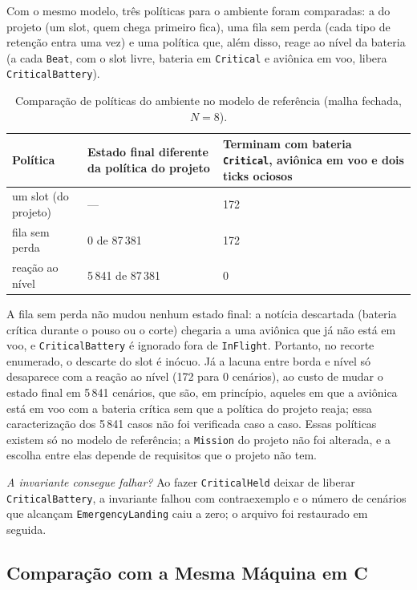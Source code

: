 \documentclass[12pt,a4paper]{article}
\begin{document}
Com o mesmo modelo, três políticas para o ambiente foram comparadas: a do projeto (um slot, quem chega primeiro fica), uma fila sem perda (cada tipo de retenção entra uma vez) e uma política que, além disso, reage ao nível da bateria (a cada \texttt{Beat}, com o slot livre, bateria em \texttt{Critical} e aviônica em voo, libera \texttt{CriticalBattery}).

\begin{table}[h]
\centering
\footnotesize
\begin{tabular}{|p{5.2cm}|p{4.6cm}|p{4.6cm}|}
\hline
Política & Estado final diferente da política do projeto & Terminam com bateria \texttt{Critical}, aviônica em voo e dois ticks ociosos \\
\hline
um slot (do projeto) & --- & 172 \\
\hline
fila sem perda & 0 de 87\,381 & 172 \\
\hline
reação ao nível & 5\,841 de 87\,381 & 0 \\
\hline
\end{tabular}
\caption{Comparação de políticas do ambiente no modelo de referência (malha fechada, $N = 8$).}
\end{table}

A fila sem perda não mudou nenhum estado final: a notícia descartada (bateria crítica durante o pouso ou o corte) chegaria a uma aviônica que já não está em voo, e \texttt{CriticalBattery} é ignorado fora de \texttt{InFlight}. Portanto, no recorte enumerado, o descarte do slot é inócuo. Já a lacuna entre borda e nível só desaparece com a reação ao nível (172 para 0 cenários), ao custo de mudar o estado final em 5\,841 cenários, que são, em princípio, aqueles em que a aviônica está em voo com a bateria crítica sem que a política do projeto reaja; essa caracterização dos 5\,841 casos não foi verificada caso a caso. Essas políticas existem só no modelo de referência; a \texttt{Mission} do projeto não foi alterada, e a escolha entre elas depende de requisitos que o projeto não tem.

\textit{A invariante consegue falhar?} Ao fazer \texttt{CriticalHeld} deixar de liberar \texttt{CriticalBattery}, a invariante falhou com contraexemplo e o número de cenários que alcançam \texttt{EmergencyLanding} caiu a zero; o arquivo foi restaurado em seguida.

\subsection{Comparação com a Mesma Máquina em C}
\end{document}
